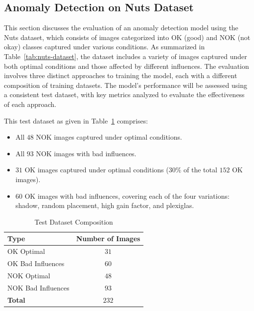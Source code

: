 \documentclass[12pt,DIV14,BCOR12mm,a4paper,footinclude=false,headinclude,parskip=half-,twoside,openright,cleardoublepage=empty,toc=index,bibliography=totoc,listof=totoc]{scrreprt}
\numberwithin{equation}{chapter}
\begin{document}
\subsection{Anomaly Detection on Nuts Dataset}
This section discusses the evaluation of an anomaly detection model using the Nuts dataset, which consists of images categorized into OK (good) and NOK (not okay) classes captured under various conditions. As summarized in Table~\ref{tab:nuts-dataset}, the dataset includes a variety of images captured under both optimal conditions and those affected by different influences. The evaluation involves three distinct approaches to training the model, each with a different composition of training datasets. The model's performance will be assessed using a consistent test dataset, with key metrics analyzed to evaluate the effectiveness of each approach.

This test dataset as given in Table~\ref{tab:test-dataset-composition} comprises:

\begin{itemize}
    \item All $48$ NOK images captured under optimal conditions.
    \item All $93$ NOK images with bad influences.
    \item $31$ OK images captured under optimal conditions ($30\%$ of the total $152$ OK images).
    \item $60$ OK images with bad influences, covering each of the four variations: shadow, random placement, high gain factor, and plexiglas.
\end{itemize}

\begin{table} 
    \centering
    \caption{Test Dataset Composition}
    \label{tab:test-dataset-composition}
    \begin{tabular}{lc} %
        \toprule
        \textbf{Type} & \textbf{Number of Images} \\ 
        \midrule
        OK Optimal & $31$ \\ 
        OK Bad Influences & $60$ \\ 
        NOK Optimal & $48$ \\ 
        NOK Bad Influences & $93$ \\ 
        \midrule
        \textbf{Total} & $232$ \\ 
        \bottomrule
    \end{tabular}
\end{table}
\end{document}
